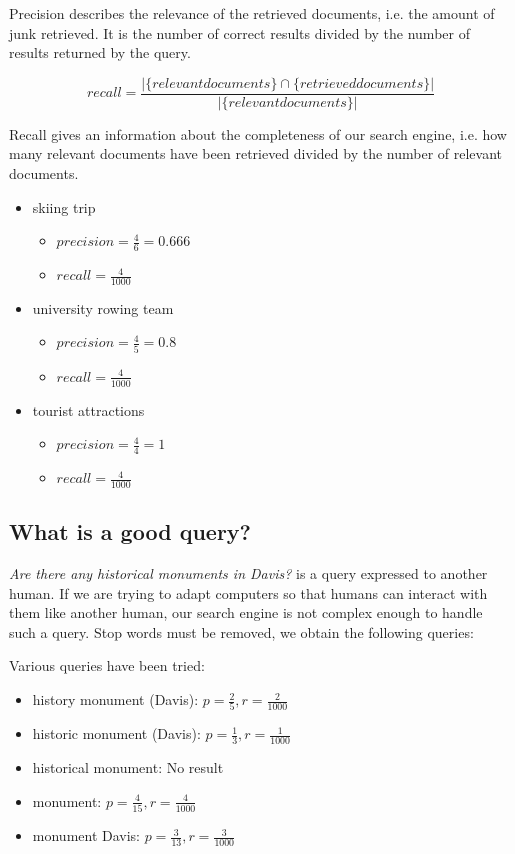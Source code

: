 Precision describes the relevance of the retrieved documents, i.e. the amount of junk retrieved. It is the number of correct results divided by the number of results returned by the query.

\begin{equation}
recall = \frac{|\{relevant documents\}\cap\{retrieved documents\}|}{|\{relevant documents\}|}
\end{equation}

Recall gives an information about the completeness of our search engine, i.e. how many relevant documents have been retrieved divided by the number of relevant documents.

\begin{itemize}
    \item skiing trip
    \begin{itemize}
        \item $ precision = \frac{4}{6} = 0.666 $
        \item $ recall = \frac{4}{1000} $
    \end{itemize}
    \item university rowing team
    \begin{itemize}
        \item $ precision = \frac{4}{5} = 0.8 $
        \item $ recall = \frac{4}{1000} $
    \end{itemize}
    \item tourist attractions
    \begin{itemize}
        \item $ precision = \frac{4}{4} = 1 $
        \item $ recall = \frac{4}{1000} $
    \end{itemize}
\end{itemize}


\subsection{What is a good query?}
\textit{Are there any historical monuments in Davis?} is a query expressed to another human. If we are trying to adapt computers so that humans can interact with them like another human, our search engine is not complex enough to handle such a query. Stop words must be removed, we obtain the following queries:

Various queries have been tried:
\begin{itemize}
\item history monument (Davis): $ p = \frac{2}{5}, r = \frac{2}{1000} $
\item historic monument (Davis): $ p = \frac{1}{3}, r = \frac{1}{1000} $
\item historical monument: No result
\item monument: $ p = \frac{4}{15}, r = \frac{4}{1000} $
\item monument Davis: $ p = \frac{3}{13}, r = \frac{3}{1000} $
\end{itemize}


